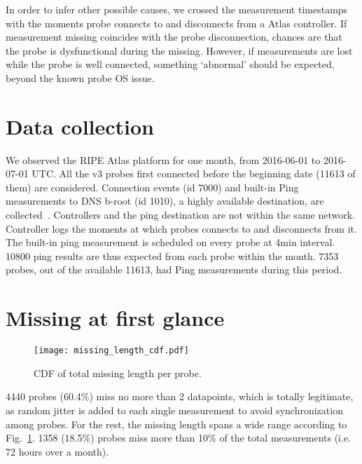 \documentclass{sig-alternate-10pt}
\begin{document}
In order to infer other possible causes, we crossed the measurement timestamps with the moments probe connects to and disconnects from a Atlas controller.
If measurement missing coincides with the probe disconnection, chances are that the probe is dysfunctional during the missing. However, if measurements are lost while the probe is well connected, something `abnormal' should be expected, beyond the known probe OS issue. 

\section{Data collection}
We observed the RIPE Atlas platform for one month, from 2016-06-01 to 2016-07-01 UTC.
All the v3 probes first connected before the beginning date (11613 of them) are considered.
Connection events (id 7000) and built-in Ping measurements to DNS b-root (id 1010), a highly available destination, are collected~\cite{built-in}. 
Controllers and the ping destination are not within the same network.
Controller logs the moments at which probes connects to and disconnects from it.
The built-in ping measurement is scheduled on every probe at 4min interval. 
10800 ping results are thus expected from each probe within the month.
7353 probes, out of the available 11613, had Ping measurements during this period.

\section{Missing at first glance}
\begin{figure}
\centering
\texttt{[image: missing\_length\_cdf.pdf]}
\caption{CDF of total missing length per probe.}
\label{fig:miss_len}
\end{figure}
4440 probes  (60.4\%) miss no more than 2 datapoints, which is totally legitimate, as random jitter is added to each single measurement to avoid synchronization among probes.
For the rest, the missing length spans a wide range according to Fig.~\ref{fig:miss_len}.
1358 (18.5\%) probes miss more than 10\% of the total measurements (i.e. 72 hours over a month).
\end{document}

